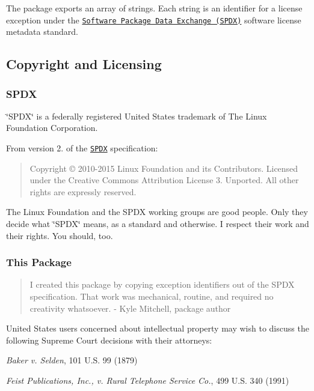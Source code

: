 The package exports an array of strings. Each string is an identifier for a license exception under the \href{https://spdx.org}{\tt Software Package Data Exchange (S\+P\+DX)} software license metadata standard.

\subsection*{Copyright and Licensing}

\subsubsection*{S\+P\+DX}

\char`\"{}\+S\+P\+D\+X\char`\"{} is a federally registered United States trademark of The Linux Foundation Corporation.

From version 2. of the \href{https://spdx.org}{\tt S\+P\+DX} specification\+:

\begin{quote}
Copyright © 2010-\/2015 Linux Foundation and its Contributors. Licensed under the Creative Commons Attribution License 3. Unported. All other rights are expressly reserved. \end{quote}


The Linux Foundation and the S\+P\+DX working groups are good people. Only they decide what \char`\"{}\+S\+P\+D\+X\char`\"{} means, as a standard and otherwise. I respect their work and their rights. You should, too.

\subsubsection*{This Package}

\begin{quote}
I created this package by copying exception identifiers out of the S\+P\+DX specification. That work was mechanical, routine, and required no creativity whatsoever. -\/ Kyle Mitchell, package author \end{quote}


United States users concerned about intellectual property may wish to discuss the following Supreme Court decisions with their attorneys\+:


\begin{DoxyItemize}
\item {\itshape Baker v. Selden}, 101 U.\+S. 99 (1879)
\item {\itshape Feist Publications, Inc., v. Rural Telephone Service Co.}, 499 U.\+S. 340 (1991) 
\end{DoxyItemize}